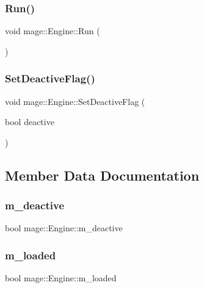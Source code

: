 \subsubsection{\texorpdfstring{Run()}{Run()}}
{\footnotesize\ttfamily void mage\+::\+Engine\+::\+Run (\begin{DoxyParamCaption}{ }\end{DoxyParamCaption})}

\hypertarget{classmage_1_1_engine_a942bfa9892fa79bb1068d7c7ec4e6732}{}\label{classmage_1_1_engine_a942bfa9892fa79bb1068d7c7ec4e6732} 
\subsubsection{\texorpdfstring{Set\+Deactive\+Flag()}{SetDeactiveFlag()}}
{\footnotesize\ttfamily void mage\+::\+Engine\+::\+Set\+Deactive\+Flag (\begin{DoxyParamCaption}\item[{bool}]{deactive }\end{DoxyParamCaption})}



\subsection{Member Data Documentation}
\hypertarget{classmage_1_1_engine_ab8a4b0157403708ae7d1d018a95b4c63}{}\label{classmage_1_1_engine_ab8a4b0157403708ae7d1d018a95b4c63} 
\subsubsection{\texorpdfstring{m\+\_\+deactive}{m\_deactive}}
{\footnotesize\ttfamily bool mage\+::\+Engine\+::m\+\_\+deactive\hspace{0.3cm}{\ttfamily [private]}}

\hypertarget{classmage_1_1_engine_a2f8783761b9629dd507d0a6bc456125b}{}\label{classmage_1_1_engine_a2f8783761b9629dd507d0a6bc456125b} 
\subsubsection{\texorpdfstring{m\+\_\+loaded}{m\_loaded}}
{\footnotesize\ttfamily bool mage\+::\+Engine\+::m\+\_\+loaded\hspace{0.3cm}{\ttfamily [private]}}

